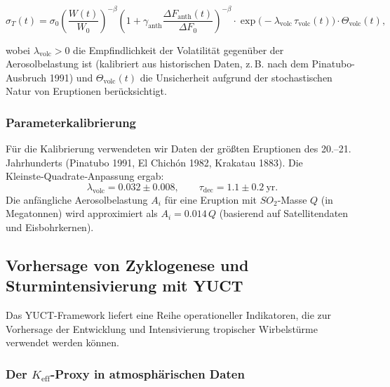 \documentclass[12pt,a4paper]{article}
\begin{document}
	\[
	\sigma_T(t) = \sigma_0 \left( \frac{W(t)}{W_0} \right)^{-\beta}
	\left(1 + \gamma_{\text{anth}} \frac{\Delta F_{\text{anth}}(t)}{\Delta F_0}\right)^{-\beta}
	\cdot \exp\!\bigl(-\lambda_{\text{volc}} \,\tau_{\text{volc}}(t)\bigr) \cdot \Theta_{\text{volc}}(t),
	\]
	
	wobei \(\lambda_{\text{volc}} > 0\) die Empfindlichkeit der Volatilität gegenüber der Aerosolbelastung ist (kalibriert aus historischen Daten, z. B. nach dem Pinatubo-Ausbruch 1991) und \(\Theta_{\text{volc}}(t)\) die Unsicherheit aufgrund der stochastischen Natur von Eruptionen berücksichtigt.
	
	\subsubsection{Parameterkalibrierung}
	
	Für die Kalibrierung verwendeten wir Daten der größten Eruptionen des 20.–21. Jahrhunderts (Pinatubo 1991, El Chichón 1982, Krakatau 1883). Die Kleinste‑Quadrate‑Anpassung ergab:
	\[
	\lambda_{\text{volc}} = 0.032 \pm 0.008, \qquad \tau_{\text{dec}} = 1.1 \pm 0.2\ \text{yr}.
	\]
	Die anfängliche Aerosolbelastung \(A_i\) für eine Eruption mit \(SO_2\)-Masse \(Q\) (in Megatonnen) wird approximiert als \(A_i = 0.014\,Q\) (basierend auf Satellitendaten und Eisbohrkernen).
	
	\subsection{Vorhersage von Zyklogenese und Sturmintensivierung mit YUCT}
	\label{subsec:cyclone_prediction}
	
	Das YUCT-Framework liefert eine Reihe operationeller Indikatoren, die zur Vorhersage der Entwicklung und Intensivierung tropischer Wirbelstürme verwendet werden können.
	
	\subsubsection*{Der \(K_{\mathrm{eff}}\)-Proxy in atmosphärischen Daten}
	
\end{document}
